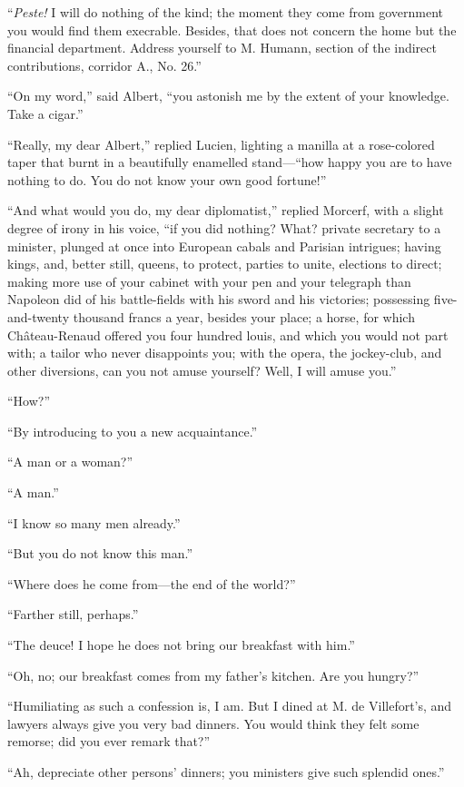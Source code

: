 “\textit{Peste!} I will do nothing of the kind; the moment they come from
government you would find them execrable. Besides, that does not
concern the home but the financial department. Address yourself to M.
Humann, section of the indirect contributions, corridor A., No. 26.”

“On my word,” said Albert, “you astonish me by the extent of your
knowledge. Take a cigar.”

“Really, my dear Albert,” replied Lucien, lighting a manilla at a
rose-colored taper that burnt in a beautifully enamelled stand—“how
happy you are to have nothing to do. You do not know your own good
fortune!”

“And what would you do, my dear diplomatist,” replied Morcerf, with a
slight degree of irony in his voice, “if you did nothing? What? private
secretary to a minister, plunged at once into European cabals and
Parisian intrigues; having kings, and, better still, queens, to
protect, parties to unite, elections to direct; making more use of your
cabinet with your pen and your telegraph than Napoleon did of his
battle-fields with his sword and his victories; possessing
five-and-twenty thousand francs a year, besides your place; a horse,
for which Château-Renaud offered you four hundred louis, and which you
would not part with; a tailor who never disappoints you; with the
opera, the jockey-club, and other diversions, can you not amuse
yourself? Well, I will amuse you.”

“How?”

“By introducing to you a new acquaintance.”

“A man or a woman?”

“A man.”

“I know so many men already.”

“But you do not know this man.”

“Where does he come from—the end of the world?”

“Farther still, perhaps.”

“The deuce! I hope he does not bring our breakfast with him.”

“Oh, no; our breakfast comes from my father’s kitchen. Are you hungry?”

“Humiliating as such a confession is, I am. But I dined at M. de
Villefort’s, and lawyers always give you very bad dinners. You would
think they felt some remorse; did you ever remark that?”

“Ah, depreciate other persons’ dinners; you ministers give such
splendid ones.”

